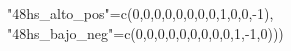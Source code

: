 \documentclass[
]{article}
\newenvironment{Shaded}{\begin{snugshade}}{\end{snugshade}}
\newcommand{\DecValTok}[1]{\textcolor[rgb]{0.00,0.00,0.81}{#1}}
\newcommand{\FunctionTok}[1]{\textcolor[rgb]{0.00,0.00,0.00}{#1}}
\newcommand{\NormalTok}[1]{#1}
\newcommand{\OtherTok}[1]{\textcolor[rgb]{0.56,0.35,0.01}{#1}}
\newcommand{\SpecialCharTok}[1]{\textcolor[rgb]{0.00,0.00,0.00}{#1}}
\newcommand{\StringTok}[1]{\textcolor[rgb]{0.31,0.60,0.02}{#1}}
\begin{document}
\begin{Shaded}
\begin{Highlighting}[]
                     \StringTok{"48hs\_alto\_pos"}\OtherTok{=}\FunctionTok{c}\NormalTok{(}\DecValTok{0}\NormalTok{,}\DecValTok{0}\NormalTok{,}\DecValTok{0}\NormalTok{,}\DecValTok{0}\NormalTok{,}\DecValTok{0}\NormalTok{,}\DecValTok{0}\NormalTok{,}\DecValTok{0}\NormalTok{,}\DecValTok{0}\NormalTok{,}\DecValTok{1}\NormalTok{,}\DecValTok{0}\NormalTok{,}\DecValTok{0}\NormalTok{,}\SpecialCharTok{{-}}\DecValTok{1}\NormalTok{), }
                     \StringTok{"48hs\_bajo\_neg"}\OtherTok{=}\FunctionTok{c}\NormalTok{(}\DecValTok{0}\NormalTok{,}\DecValTok{0}\NormalTok{,}\DecValTok{0}\NormalTok{,}\DecValTok{0}\NormalTok{,}\DecValTok{0}\NormalTok{,}\DecValTok{0}\NormalTok{,}\DecValTok{0}\NormalTok{,}\DecValTok{0}\NormalTok{,}\DecValTok{0}\NormalTok{,}\DecValTok{1}\NormalTok{,}\SpecialCharTok{{-}}\DecValTok{1}\NormalTok{,}\DecValTok{0}\NormalTok{)))}


\end{Highlighting}
\end{Shaded}
\end{document}
